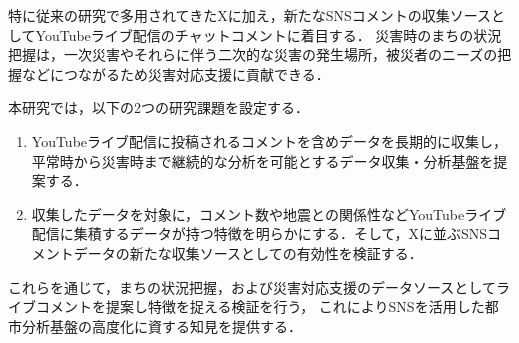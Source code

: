 特に従来の研究で多用されてきたXに加え，新たなSNSコメントの収集ソースとしてYouTubeライブ配信のチャットコメントに着目する．
災害時のまちの状況把握は，一次災害やそれらに伴う二次的な災害の発生場所，被災者のニーズの把握などにつながるため災害対応支援に貢献できる．

本研究では，以下の2つの研究課題を設定する．
\begin{enumerate}
    \item YouTubeライブ配信に投稿されるコメントを含めデータを長期的に収集し，平常時から災害時まで継続的な分析を可能とするデータ収集・分析基盤を提案する．

    \item 収集したデータを対象に，コメント数や地震との関係性などYouTubeライブ配信に集積するデータが持つ特徴を明らかにする．そして，Xに並ぶSNSコメントデータの新たな収集ソースとしての有効性を検証する．
\end{enumerate}

これらを通じて，まちの状況把握，および災害対応支援のデータソースとしてライブコメントを提案し特徴を捉える検証を行う，
これによりSNSを活用した都市分析基盤の高度化に資する知見を提供する．